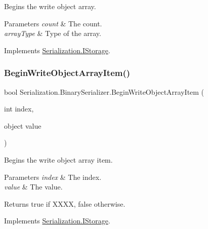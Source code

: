 Begins the write object array. 


\begin{DoxyParams}{Parameters}
{\em count} & The count.\\
\hline
{\em array\+Type} & Type of the array.\\
\hline
\end{DoxyParams}


Implements \hyperlink{interface_serialization_1_1_i_storage_afc5be795dc2ef9b4fc64abbd764ac7e5}{Serialization.\+I\+Storage}.

\mbox{\label{class_serialization_1_1_binary_serializer_a3853730f36226738133280f47ee43550}} 
\subsubsection{\texorpdfstring{Begin\+Write\+Object\+Array\+Item()}{BeginWriteObjectArrayItem()}}
{\footnotesize\ttfamily bool Serialization.\+Binary\+Serializer.\+Begin\+Write\+Object\+Array\+Item (\begin{DoxyParamCaption}\item[{int}]{index,  }\item[{object}]{value }\end{DoxyParamCaption})\hspace{0.3cm}{\ttfamily [inline]}}



Begins the write object array item. 


\begin{DoxyParams}{Parameters}
{\em index} & The index.\\
\hline
{\em value} & The value.\\
\hline
\end{DoxyParams}
\begin{DoxyReturn}{Returns}
{\ttfamily true} if X\+X\+XX, {\ttfamily false} otherwise.
\end{DoxyReturn}


Implements \hyperlink{interface_serialization_1_1_i_storage_a22a9b9ce868724387a5fe655089c08a7}{Serialization.\+I\+Storage}.

\mbox{\label{class_serialization_1_1_binary_serializer_a021a50d6702e32e15c197783a0bad05a}} 
